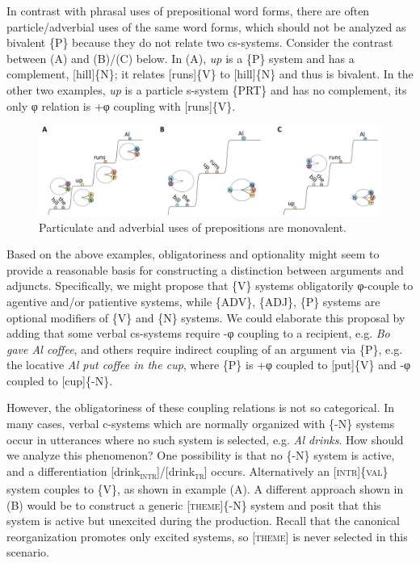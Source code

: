   In contrast with phrasal uses of prepositional word forms, there are often particle/adverbial uses of the same word forms, which should not be analyzed as bivalent \{P\} because they do not relate two cs-systems. Consider the contrast between (A) and (B)/(C) below. In (A), \textit{up} is a \{P\} system and has a complement, [hill]\{N\}; it relates [runs]\{V\} to [hill]\{N\} and thus is bivalent. In the other two examples, \textit{up} is a particle s-system \{PRT\} and has no complement, its only φ relation is +φ coupling with [runs]\{V\}.

  
\begin{figure}
\includegraphics[width=\textwidth]{figures/Tilsen-img85.png}
\caption{Particulate and adverbial uses of prepositions are monovalent.}
\label{fig:4:35}
\end{figure}
 

  Based on the above examples, obligatoriness and optionality might seem to provide a reasonable basis for constructing a distinction between arguments and adjuncts. Specifically, we might propose that \{V\} systems obligatorily φ-couple to agentive and/or patientive systems, while \{ADV\}, \{ADJ\}, \{P\} systems are optional modifiers of \{V\} and \{N\} systems. We could elaborate this proposal by adding that some verbal cs-systems require -φ coupling to a recipient, e.g. \textit{Bo gave Al coffee}, and others require indirect coupling of an argument via \{P\}, e.g. the locative \textit{Al put coffee in the cup}, where \{P\} is +φ coupled to [put]\{V\} and -φ coupled to [cup]\{-N\}.

  However, the obligatoriness of these coupling relations is not so categorical. In many cases, verbal c-systems which are normally organized with \{-N\} systems occur in utterances where no such system is selected, e.g. \textit{Al drinks}. How should we analyze this phenomenon? One possibility is that no \{-N\} system is active, and a differentiation [drink\textsc{\textsubscript{intr}}]/[drink\textsc{\textsubscript{tr}}] occurs. Alternatively an [\textsc{intr}]\{\textsc{val}\} system couples to \{V\}, as shown in example (A). A different approach shown in (B) would be to construct a generic [\textsc{theme}]\{-N\} system and posit that this system is active but unexcited during the production. Recall that the canonical reorganization promotes only excited systems, so [\textsc{theme}] is never selected in this scenario. 

